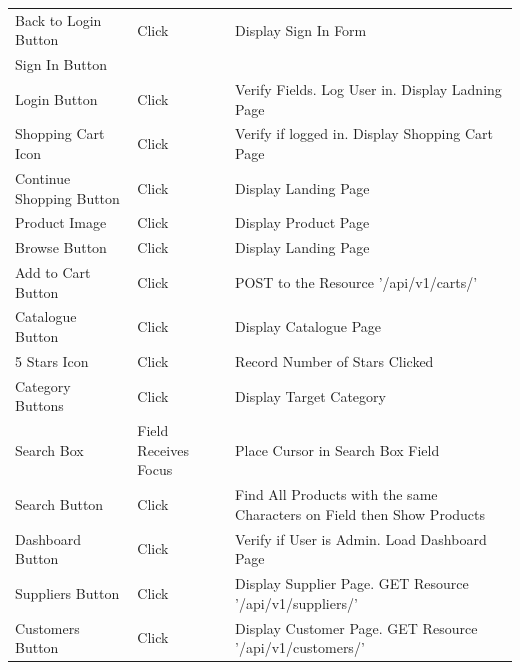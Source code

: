 \documentclass{report}
\begin{document}
\begin{center}
	\begin{tabular}{ m{1.5in} | m{1.5in} | m{1.5in} }
	Back to Login Button & Click 				& Display Sign In Form \\ \cline{1-1}
	Sign In Button 		& 						& \\
	\hline
	Login Button 		& Click 					& Verify Fields. Log User in. Display Ladning Page \\
	\hline
	Shopping Cart Icon 	& Click 					& Verify if logged in. Display Shopping Cart Page \\
	\hline
	Continue Shopping Button & Click 				& Display Landing Page \\
	\hline 
	Product Image 		& Click 					& Display Product Page \\
	\hline 
	Browse Button 		& Click 					& Display Landing Page \\
	\hline
	Add to Cart Button 	& Click 					& POST to the Resource '/api/v1/carts/' \\
	\hline 
	Catalogue Button 	& Click 					& Display Catalogue Page \\
	\hline 
	5 Stars Icon 		& Click 					& Record Number of Stars Clicked \\
	\hline
	Category Buttons 	& Click 					& Display Target Category \\
	\hline 
	Search Box 			& Field Receives Focus 	& Place Cursor in Search Box Field \\
	\hline
	Search Button 		& Click 					& Find All Products with the same Characters on Field then Show Products \\
	\hline
	Dashboard Button 	& Click 					& Verify if User is Admin. Load Dashboard Page \\
	\hline
	Suppliers Button 	& Click 					& Display Supplier Page. GET Resource '/api/v1/suppliers/' \\
	\hline
	Customers Button 	& Click 					& Display Customer Page. GET Resource '/api/v1/customers/' \\		
	\end{tabular}

	\newpage	
	

\end{center}
\end{document}
